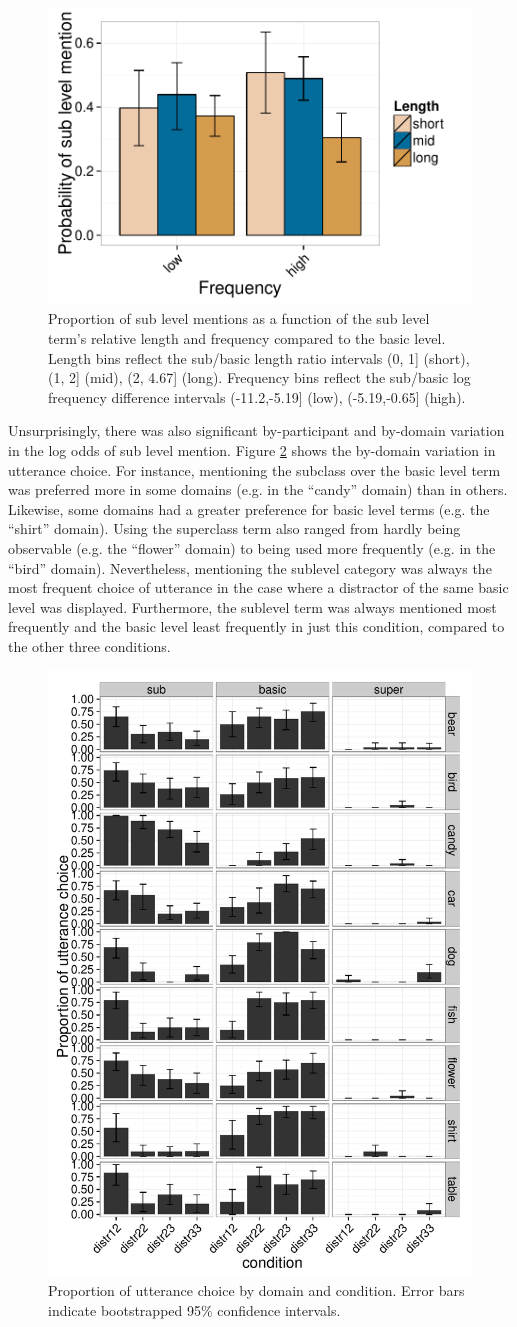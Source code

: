 \documentclass[10pt,letterpaper]{article}
\newcommand{\figref}[1]{Figure \ref{#1}}
\begin{document}
\begin{figure}[ht!]
\centering
\includegraphics[width=.5\textwidth]{graphs/freq-length-interaction}
\caption{Proportion of sub level mentions  as a function of the sub level term's relative length and frequency compared to the basic level. Length bins reflect the sub/basic length ratio intervals (0, 1] (short), (1, 2] (mid), (2, 4.67] (long). Frequency bins reflect the sub/basic log frequency difference intervals (-11.2,-5.19] (low), (-5.19,-0.65] (high).}
\label{fig:lengthfreqinteraction}
\end{figure}


Unsurprisingly, there was also significant by-participant and by-domain variation in the log odds of sub level mention. \figref{fig:domains} shows the by-domain variation in utterance choice. For instance, mentioning the subclass over the basic level term was preferred more in some domains (e.g. in the ``candy'' domain) than in others. Likewise, some domains had a greater preference for basic level terms (e.g. the ``shirt'' domain). Using the superclass term also ranged from hardly being observable (e.g. the ``flower'' domain) to being used more frequently (e.g. in the ``bird'' domain). Nevertheless, mentioning the sublevel category was always the most frequent choice of utterance in the case where a distractor of the same basic level was displayed. Furthermore, the sublevel term was always mentioned most frequently and the basic level least frequently in just this condition, compared to the other three conditions.


\begin{figure}[ht!]
\centering
\includegraphics[width=.5\textwidth]{graphs/results-bydomain}
\caption{Proportion of utterance choice by domain and condition. Error bars indicate bootstrapped 95\% confidence intervals.}
\label{fig:domains}
\end{figure}
\end{document}
